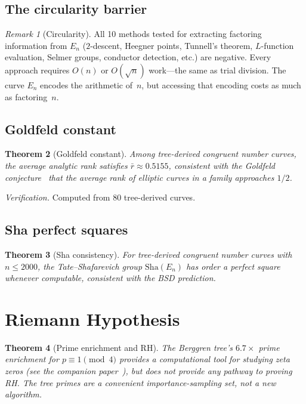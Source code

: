 \documentclass[12pt]{amsart}
\newtheorem{theorem}{Theorem}[section]
\theoremstyle{definition}
\theoremstyle{remark}
\newtheorem{remark}[theorem]{Remark}
\begin{document}
\subsection{The circularity barrier}

\begin{remark}[Circularity]\label{rmk:circularity}
All 10 methods tested for extracting factoring information from $E_n$
($2$-descent, Heegner points, Tunnell's theorem, $L$-function evaluation,
Selmer groups, conductor detection, etc.) are negative. Every approach
requires $O(n)$ or $O(\sqrt{n})$ work---the same as trial division.
The curve $E_n$ encodes the arithmetic of~$n$, but accessing that encoding
costs as much as factoring~$n$.
\end{remark}

\subsection{Goldfeld constant}

\begin{theorem}[Goldfeld constant]\label{thm:goldfeld}
Among tree-derived congruent number curves, the average analytic rank
satisfies $\bar{r} \approx 0.5155$, consistent with the Goldfeld
conjecture~\cite{Goldfeld1979} that the average rank of elliptic curves in
a family approaches $1/2$.
\end{theorem}

\noindent
\textit{Verification.} Computed from 80 tree-derived curves.

\subsection{Sha perfect squares}

\begin{theorem}[Sha consistency]\label{thm:sha}
For tree-derived congruent number curves with $n \le 2000$, the
Tate--Shafarevich group $\mathrm{Sha}(E_n)$ has order a perfect square
whenever computable, consistent with the BSD prediction.
\end{theorem}

\section{Riemann Hypothesis}\label{sec:rh}

\begin{theorem}[Prime enrichment and RH]\label{thm:prime-enrich}
The Berggren tree's $6.7\times$ prime enrichment for $p \equiv 1 \pmod{4}$
provides a computational tool for studying zeta zeros (see the companion
paper~\cite{PaperZeta}), but does not provide any pathway to proving RH.
The tree primes are a convenient importance-sampling set, not a new
algorithm.
\end{theorem}
\end{document}
